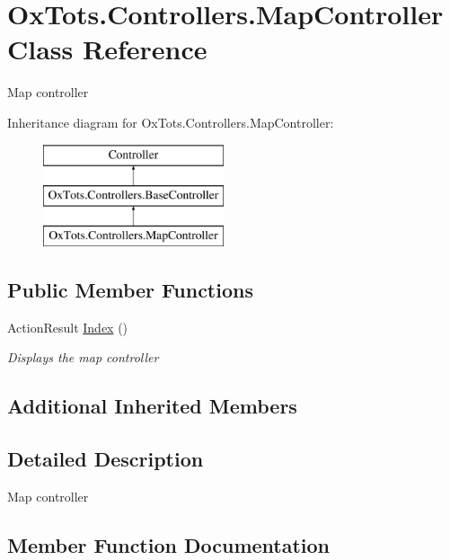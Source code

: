 \hypertarget{class_ox_tots_1_1_controllers_1_1_map_controller}{}\section{Ox\+Tots.\+Controllers.\+Map\+Controller Class Reference}
\label{class_ox_tots_1_1_controllers_1_1_map_controller}


Map controller  


Inheritance diagram for Ox\+Tots.\+Controllers.\+Map\+Controller\+:\begin{figure}[H]
\begin{center}
\leavevmode
\includegraphics[height=3.000000cm]{class_ox_tots_1_1_controllers_1_1_map_controller}
\end{center}
\end{figure}
\subsection*{Public Member Functions}
\begin{DoxyCompactItemize}
\item 
Action\+Result \mbox{\hyperlink{class_ox_tots_1_1_controllers_1_1_map_controller_a443e3cf6f718cec081e5f94b67603bc4}{Index}} ()
\begin{DoxyCompactList}\small\item\em Displays the map controller \end{DoxyCompactList}\end{DoxyCompactItemize}
\subsection*{Additional Inherited Members}


\subsection{Detailed Description}
Map controller 



\subsection{Member Function Documentation}
\mbox{\label{class_ox_tots_1_1_controllers_1_1_map_controller_a443e3cf6f718cec081e5f94b67603bc4}} 
